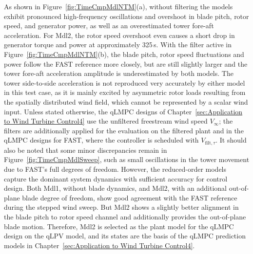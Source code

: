     As shown in Figure~\ref{fig:TimeCmpMdlNTM}(a), without filtering the models exhibit pronounced high-frequency oscillations and overshoot in blade pitch, rotor speed, and generator power, as well as an overestimated tower fore-aft acceleration. For Mdl2, the rotor speed overshoot even causes a short drop in generator torque and power at approximately 325\,s. With the filter active in Figure~\ref{fig:TimeCmpMdlNTM}(b), the blade pitch,  rotor speed fluctuations and power follow the FAST reference more closely, but are still slightly larger and the tower fore-aft acceleration amplitude is underestimated by both models. The tower side-to-side acceleration is not reproduced very accurately by either model in this test case, as it is mainly excited by asymmetric rotor loads resulting from the spatially distributed wind field, which cannot be represented by a scalar wind input. Unless stated otherwise, the qLMPC designs of Chapter~\ref{sec:Application to Wind Turbine Control4} use the unfiltered freestream wind speed $V_\infty$; the filters are additionally applied for the evaluation on the filtered plant and in the qLMPC designs for FAST, where the controller is scheduled with $V_{\text{filt},\tau}$.
    It should also be noted that some minor discrepancies remain in Figure~\ref{fig:TimeCmpMdlSweep}, such as small oscillations in the tower movement due to FAST's full degrees of freedom. However, the reduced-order models capture the dominant system dynamics with sufficient accuracy for control design. Both Mdl1, without blade dynamics, and Mdl2, with an additional out-of-plane blade degree of freedom, show good agreement with the FAST reference during the stepped wind sweep.  But Mdl2 shows a slightly better alignment in the blade pitch to rotor speed channel and additionally provides the out-of-plane blade motion. Therefore, Mdl2 is selected as the plant model for the qLMPC design on the qLPV model, and its states are the basis of the qLMPC prediction models in Chapter~\ref{sec:Application to Wind Turbine Control4}.
